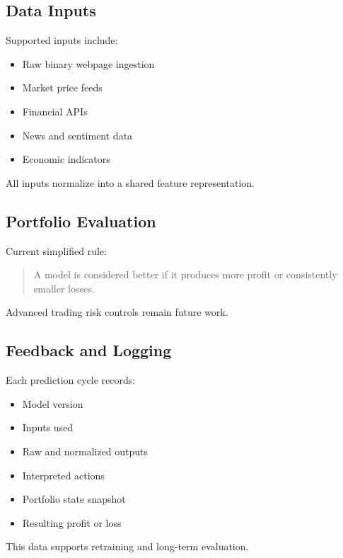 \documentclass[11pt]{article}
\begin{document}
\subsection*{Data Inputs}

Supported inputs include:

\begin{itemize}
\item Raw binary webpage ingestion
\item Market price feeds
\item Financial APIs
\item News and sentiment data
\item Economic indicators
\end{itemize}

All inputs normalize into a shared feature representation.

\subsection*{Portfolio Evaluation}

Current simplified rule:

\begin{quote}
A model is considered better if it produces more profit or consistently smaller losses.
\end{quote}

Advanced trading risk controls remain future work.

\subsection*{Feedback and Logging}

Each prediction cycle records:

\begin{itemize}
\item Model version
\item Inputs used
\item Raw and normalized outputs
\item Interpreted actions
\item Portfolio state snapshot
\item Resulting profit or loss
\end{itemize}

This data supports retraining and long-term evaluation.
\end{document}
